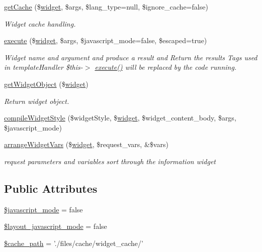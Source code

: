 \begin{DoxyCompactItemize}
\hyperlink{classwidgetController_ad866136705c196f9b7b231f58be317eb}{get\+Cache} (\$\hyperlink{classwidget}{widget}, \$args, \$lang\+\_\+type=null, \$ignore\+\_\+cache=false)
\begin{DoxyCompactList}\small\item\em Widget cache handling. \end{DoxyCompactList}\item 
\hyperlink{classwidgetController_a8344d21b83ae400500e70f371817a8d9}{execute} (\$\hyperlink{classwidget}{widget}, \$args, \$javascript\+\_\+mode=false, \$escaped=true)
\begin{DoxyCompactList}\small\item\em Widget name and argument and produce a result and Return the results Tags used in template\+Handler \$this-\/$>$ \hyperlink{classwidgetController_a8344d21b83ae400500e70f371817a8d9}{execute()} will be replaced by the code running. \end{DoxyCompactList}\item 
\hyperlink{classwidgetController_a15059522aa8548d03668025d20d6d152}{get\+Widget\+Object} (\$\hyperlink{classwidget}{widget})
\begin{DoxyCompactList}\small\item\em Return widget object. \end{DoxyCompactList}\item 
\hyperlink{classwidgetController_ad399f4e9088de6b63e479bfd68c1f2a0}{compile\+Widget\+Style} (\$widget\+Style, \$\hyperlink{classwidget}{widget}, \$widget\+\_\+content\+\_\+body, \$args, \$javascript\+\_\+mode)
\item 
\hyperlink{classwidgetController_a7f852fc1f0b521ff574f85ee067173ce}{arrange\+Widget\+Vars} (\$\hyperlink{classwidget}{widget}, \$request\+\_\+vars, \&\$vars)
\begin{DoxyCompactList}\small\item\em request parameters and variables sort through the information widget \end{DoxyCompactList}\end{DoxyCompactItemize}
\subsection*{Public Attributes}
\begin{DoxyCompactItemize}
\item 
\hyperlink{classwidgetController_a9879a9de581b205ffa63cc0297dcefab}{\$javascript\+\_\+mode} = false
\item 
\hyperlink{classwidgetController_ab123ebb549e616c6e67bf79e73f56ac8}{\$layout\+\_\+javascript\+\_\+mode} = false
\item 
\hyperlink{classwidgetController_a279375b189444d13250d8111910655c3}{\$cache\+\_\+path} = './files/cache/widget\+\_\+cache/'
\end{DoxyCompactItemize}


